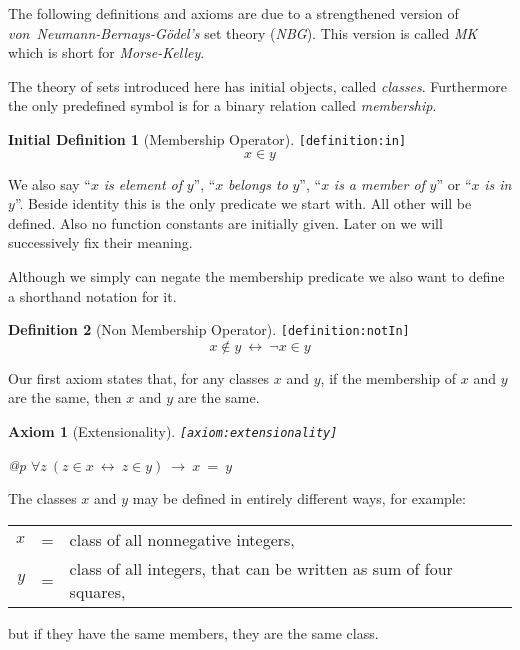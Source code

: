 \documentclass[a4paper,german,10pt,twoside]{book}
\newtheorem{ax}{Axiom}
\theoremstyle{definition}
\newtheorem{defn}{Definition}
\newtheorem{idefn}[defn]{Initial Definition}
\theoremstyle{remark}
\begin{document}
\par
The following definitions and axioms are due to a strengthened version of \emph{von~Neumann-Bernays-G{\"o}del's} set theory (\emph{NBG}). This version is called \emph{MK} which is short for \emph{Morse-Kelley}.

\par
The theory of sets introduced here has initial objects, called \emph{classes}. Furthermore the only predefined symbol is for a binary relation called \emph{membership}.

\begin{idefn}[Membership Operator]
\label{definition:in} \hypertarget{definition:in}{}
{\tt \tiny [\verb]definition:in]]}
$$x \in y
$$

\end{idefn}

We also say ``$x$ \emph{is element of} $y$'', ``$x$ \emph{belongs to} $y$'', ``$x$ \emph{is a member of} $y$'' or ``$x$ \emph{is in} $y$''.
Beside identity this is the only predicate we start with. All other will be defined. Also no function constants are initially given. Later on we will successively fix their meaning.


\par
Although we simply can negate the membership predicate we also want to define a shorthand notation for it.

\begin{defn}[Non Membership Operator]
\label{definition:notIn} \hypertarget{definition:notIn}{}
{\tt \tiny [\verb]definition:notIn]]}
$$x \notin y\ \leftrightarrow\ \neg x \in y$$

\end{defn}


\par
Our first axiom states that, for any classes $x$ and $y$, if the membership of $x$ and $y$ are the same, then $x$ and $y$ are the same.

\begin{ax}[Extensionality]
\label{axiom:extensionality} \hypertarget{axiom:extensionality}{}
{\tt \tiny [\verb]axiom:extensionality]]}
\mbox{}
\begin{longtable}{{@{\extracolsep{\fill}}p{\linewidth}}}
\centering $\forall z\ (z \in x\ \leftrightarrow\ z \in y)\ \rightarrow\ x \ = \ y$
\end{longtable}

\end{ax}

The classes $x$ and $y$ may be defined in entirely different ways, for example:
\par
\begin{tabularx}{\linewidth}{rcX}
  $x$ & = & class of all nonnegative integers, \\
  $y$ & = & class of all integers, that can be written as sum of four squares,
\end{tabularx}
\par
but if they have the same members, they are the same class.
\end{document}
